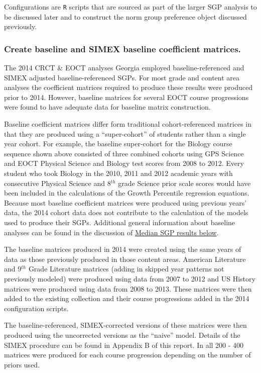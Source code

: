 \documentclass[12pt]{article}
\begin{document}
Configurations are \texttt{R} scripts that are sourced as part of the
larger SGP analysis to be discussed later and to construct the norm
group preference object discussed previously.

\subsubsection{Create baseline and SIMEX baseline coefficient
matrices.}\label{create-baseline-and-simex-baseline-coefficient-matrices.}

The 2014 CRCT \& EOCT analyses Georgia employed baseline-referenced and
SIMEX adjusted baseline-referenced SGPs. For most grade and content area
analyses the coefficient matrices required to produce these results were
produced prior to 2014. However, baseline matrices for several EOCT
course progressions were found to have adequate data for baseline matrix
construction.

Baseline coefficient matrices differ form traditional cohort-referenced
matrices in that they are produced using a ``super-cohort'' of students
rather than a single year cohort. For example, the baseline super-cohort
for the Biology course sequence shown above consisted of three combined
cohorts using GPS Science and EOCT Physical Science and Biology test
scores from 2008 to 2012. Every student who took Biology in the 2010,
2011 and 2012 academic years with consecutive Physical Science and
8\(^{th}\) grade Science prior scale scores would have been included in
the calculations of the Growth Percentile regression equations. Because
most baseline coefficient matrices were produced using previous years'
data, the 2014 cohort data does not contribute to the calculation of the
models used to produce their SGPs. Additional general information about
baseline analyses can be found in the discussion of
\hyperref[baseline-referenced-median-sgps]{Median SGP results below}.

The baseline matrices produced in 2014 were created using the same years
of data as those previously produced in those content areas. American
Literature and 9\(^{th}\) Grade Literature matrices (adding in skipped
year patterns not previously modeled) were produced using data from 2007
to 2012 and US History matrices were produced using data from 2008 to
2013. These matrices were then added to the existing collection and
their course progressions added in the 2014 configuration scripts.

The baseline-referenced, SIMEX-corrected versions of these matrices were
then produced using the uncorrected versions as the ``naive'' model.
Details of the SIMEX procedure can be found in Appendix B of this
report. In all 200 - 400 matrices were produced for each course
progression depending on the number of priors used.
\end{document}
